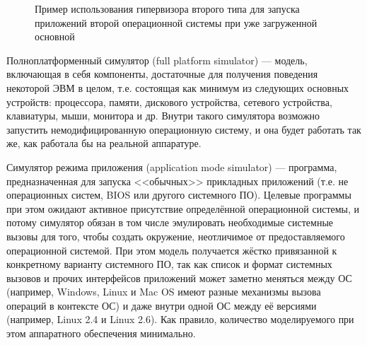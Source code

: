 \begin{description*}
\begin{figure}[htp]
    \caption[Гипервизор второго типа]{Пример использования гипервизора второго типа для запуска приложений второй операционной системы при уже загруженной основной}\label{fig:vm-type2}
\end{figure}

\item[Полноплатформенный симулятор] (\abbr full platform si\-mu\-la\-tor) --- модель, включающая в себя компоненты, достаточные для получения поведения некоторой ЭВМ в целом, т.е. состоящая как минимум из следующих основных устройств: процессора, памяти, дискового устройства, сетевого устройства, клавиатуры, мыши, монитора и др. Внутри такого симулятора возможно запустить немодифицированную операционную систему, и она будет работать так же, как работала бы на реальной аппаратуре.

\item[Симулятор режима приложения] (\abbr application mode si\-mu\-la\-tor) --- программа, предназначенная для запуска <<обычных>> прикладных приложений (т.е. не операционных систем, BIOS или другого системного ПО). Целевые программы при этом ожидают активное присутствие определённой операционной системы, и потому симулятор обязан в том числе эмулировать необходимые  системные вызовы для того, чтобы создать окружение, неотличимое от предоставляемого операционной системой. При этом модель получается жёстко привязанной к конкретному варианту системного ПО, так как список и формат системных вызовов и прочих интерфейсов приложений может заметно меняться между ОС (например, Windows, Linux и Mac OS имеют разные механизмы вызова операций в контексте ОС) и даже внутри одной ОС между её версиями (например, Linux 2.4 и Linux 2.6). Как правило, количество моделируемого при этом аппаратного обеспечения минимально.


\end{description*}
